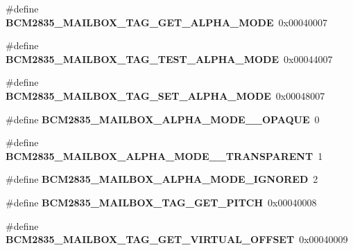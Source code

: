 \begin{DoxyCompactItemize}
\item 
\mbox{\label{group__raspberrypi__vc_gabebdc6ab2064c2e73bd7481d719f5729}} 
\#define {\bfseries B\+C\+M2835\+\_\+\+M\+A\+I\+L\+B\+O\+X\+\_\+\+T\+A\+G\+\_\+\+G\+E\+T\+\_\+\+A\+L\+P\+H\+A\+\_\+\+M\+O\+DE}~0x00040007
\item 
\mbox{\label{group__raspberrypi__vc_ga04b757e192bc2e9e052d62796645fd0c}} 
\#define {\bfseries B\+C\+M2835\+\_\+\+M\+A\+I\+L\+B\+O\+X\+\_\+\+T\+A\+G\+\_\+\+T\+E\+S\+T\+\_\+\+A\+L\+P\+H\+A\+\_\+\+M\+O\+DE}~0x00044007
\item 
\mbox{\label{group__raspberrypi__vc_ga1c3dddfb9c10167f8d8b99ac2bbe1306}} 
\#define {\bfseries B\+C\+M2835\+\_\+\+M\+A\+I\+L\+B\+O\+X\+\_\+\+T\+A\+G\+\_\+\+S\+E\+T\+\_\+\+A\+L\+P\+H\+A\+\_\+\+M\+O\+DE}~0x00048007
\item 
\mbox{\label{group__raspberrypi__vc_ga87782653536706802e1ef2d6a451955a}} 
\#define {\bfseries B\+C\+M2835\+\_\+\+M\+A\+I\+L\+B\+O\+X\+\_\+\+A\+L\+P\+H\+A\+\_\+\+M\+O\+D\+E\+\_\+\_\+\+O\+P\+A\+Q\+UE}~0
\item 
\mbox{\label{group__raspberrypi__vc_gada5621013f8d79a80f64e48845c322f8}} 
\#define {\bfseries B\+C\+M2835\+\_\+\+M\+A\+I\+L\+B\+O\+X\+\_\+\+A\+L\+P\+H\+A\+\_\+\+M\+O\+D\+E\+\_\+\_\+\+T\+R\+A\+N\+S\+P\+A\+R\+E\+NT}~1
\item 
\mbox{\label{group__raspberrypi__vc_gad9da53865c271bef6480ff3ab1bd5edc}} 
\#define {\bfseries B\+C\+M2835\+\_\+\+M\+A\+I\+L\+B\+O\+X\+\_\+\+A\+L\+P\+H\+A\+\_\+\+M\+O\+D\+E\+\_\+\+I\+G\+N\+O\+R\+ED}~2
\item 
\mbox{\label{group__raspberrypi__vc_ga47b117468a9e8dc6beffcdf2cf4bcca3}} 
\#define {\bfseries B\+C\+M2835\+\_\+\+M\+A\+I\+L\+B\+O\+X\+\_\+\+T\+A\+G\+\_\+\+G\+E\+T\+\_\+\+P\+I\+T\+CH}~0x00040008
\item 
\mbox{\label{group__raspberrypi__vc_ga2e98308c0e7776bbaf4ec01c6ce99ec5}} 
\#define {\bfseries B\+C\+M2835\+\_\+\+M\+A\+I\+L\+B\+O\+X\+\_\+\+T\+A\+G\+\_\+\+G\+E\+T\+\_\+\+V\+I\+R\+T\+U\+A\+L\+\_\+\+O\+F\+F\+S\+ET}~0x00040009

\end{DoxyCompactItemize}
